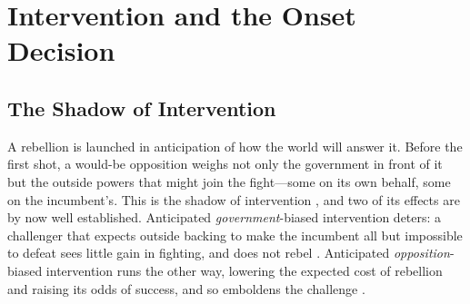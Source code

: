 
\section{Intervention and the Onset Decision}
\label{sec:motivation}

\subsection{The Shadow of Intervention}

A rebellion is launched in anticipation of how the world will answer it.
Before the first shot, a would-be opposition weighs not only the government in
front of it but the outside powers that might join the fight---some on its own
behalf, some on the incumbent's.  This is the shadow of intervention
\citep{cetinyan2002}, and two of its effects are by now well established.
Anticipated \emph{government}-biased intervention deters: a challenger that
expects outside backing to make the incumbent all but impossible to defeat
sees little gain in fighting, and does not rebel \citep{cunningham2016}.
Anticipated \emph{opposition}-biased intervention runs the other way, lowering
the expected cost of rebellion and raising its odds of success, and so
emboldens the challenge \citep{kuperman2008, thyne2006, qiu2022}.

